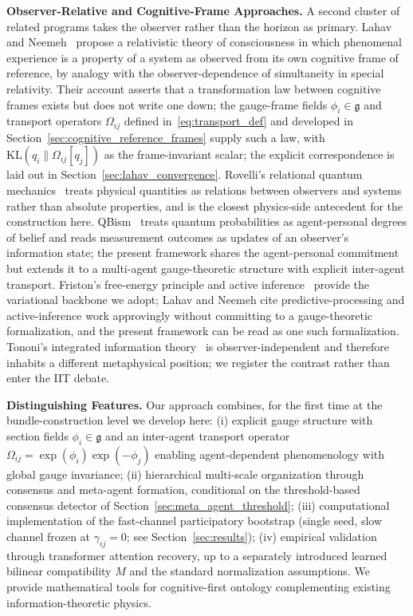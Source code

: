 \documentclass[11pt]{article}
\begin{document}
\textbf{Observer-Relative and Cognitive-Frame Approaches.} A second cluster of related programs takes the observer rather than the horizon as primary. Lahav and Neemeh~\cite{LahavNeemeh2022, LahavNeemeh2025} propose a relativistic theory of consciousness in which phenomenal experience is a property of a system as observed from its own cognitive frame of reference, by analogy with the observer-dependence of simultaneity in special relativity. Their account asserts that a transformation law between cognitive frames exists but does not write one down; the gauge-frame fields $\phi_i \in \mathfrak{g}$ and transport operators $\Omega_{ij}$ defined in~\eqref{eq:transport_def} and developed in Section~\ref{sec:cognitive_reference_frames} supply such a law, with $\mathrm{KL}(q_i \| \Omega_{ij}[q_j])$ as the frame-invariant scalar; the explicit correspondence is laid out in Section~\ref{sec:lahav_convergence}. Rovelli's relational quantum mechanics~\cite{Rovelli1996} treats physical quantities as relations between observers and systems rather than absolute properties, and is the closest physics-side antecedent for the construction here. QBism~\cite{Fuchs2014} treats quantum probabilities as agent-personal degrees of belief and reads measurement outcomes as updates of an observer's information state; the present framework shares the agent-personal commitment but extends it to a multi-agent gauge-theoretic structure with explicit inter-agent transport. Friston's free-energy principle and active inference~\cite{Friston2010, Friston2017, parr2022active} provide the variational backbone we adopt; Lahav and Neemeh cite predictive-processing and active-inference work approvingly without committing to a gauge-theoretic formalization, and the present framework can be read as one such formalization. Tononi's integrated information theory~\cite{Tononi2008, Tononi2016} is observer-independent and therefore inhabits a different metaphysical position; we register the contrast rather than enter the IIT debate.

\textbf{Distinguishing Features.} Our approach combines, for the first time at the bundle-construction level we develop here: (i) explicit gauge structure with section fields $\phi_i \in \mathfrak{g}$ and an inter-agent transport operator $\Omega_{ij} = \exp(\phi_i)\exp(-\phi_j)$ enabling agent-dependent phenomenology with global gauge invariance; (ii) hierarchical multi-scale organization through consensus and meta-agent formation, conditional on the threshold-based consensus detector of Section~\ref{sec:meta_agent_threshold}; (iii) computational implementation of the fast-channel participatory bootstrap (single seed, slow channel frozen at $\gamma_{ij} = 0$; see Section~\ref{sec:results}); (iv) empirical validation through transformer attention recovery, up to a separately introduced learned bilinear compatibility $M$ and the standard normalization assumptions. We provide mathematical tools for cognitive-first ontology complementing existing information-theoretic physics.
\end{document}
